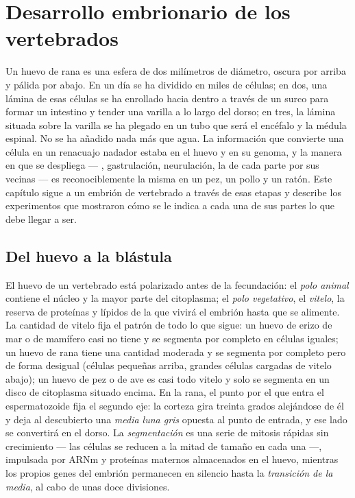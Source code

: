 \chapter{Desarrollo embrionario de los vertebrados}\label{ch:b2:vertebrate-development}

Un huevo de rana es una esfera de dos milímetros de diámetro, oscura por
arriba y pálida por abajo. En un día se ha dividido en miles de células;
en dos, una lámina de esas células se ha enrollado hacia dentro a través
de un surco para formar un intestino y tender una varilla a lo largo del
dorso; en tres, la lámina situada sobre la varilla se ha plegado en un
tubo que será el encéfalo y la médula espinal. No se ha añadido nada más
que agua. La información que convierte una célula en un renacuajo
nadador estaba en el huevo y en su genoma, y la manera en que se despliega
--- , gastrulación, neurulación, la  de cada parte
por sus vecinas --- es reconociblemente la misma en un pez, un pollo y un
ratón. Este capítulo sigue a un embrión de vertebrado a través de esas
etapas y describe los experimentos que mostraron cómo se le indica a cada
una de sus partes lo que debe llegar a ser.

\section{Del huevo a la blástula}

\begin{definition}\label{def:b2:vertebrate-development:egg}
El huevo de un vertebrado está polarizado antes de la fecundación: el
\emph{polo animal} contiene el núcleo y la mayor parte del citoplasma; el
\emph{polo vegetativo}, el \emph{vitelo}, la reserva de proteínas y
lípidos de la que vivirá el embrión hasta que se alimente. La cantidad de
vitelo fija el patrón de todo lo que sigue: un huevo de erizo de mar o de
mamífero casi no tiene y se segmenta por completo en células iguales; un
huevo de rana tiene una cantidad moderada y se segmenta por completo pero
de forma desigual (células pequeñas arriba, grandes células cargadas de
vitelo abajo); un huevo de pez o de ave es casi todo vitelo y solo se
segmenta en un disco de citoplasma situado encima. En la rana, el punto
por el que entra el espermatozoide fija el segundo eje: la corteza gira
treinta grados alejándose de él y deja al descubierto una \emph{media
luna gris} opuesta al punto de entrada, y ese lado se convertirá en el
dorso. La \emph{segmentación} es una serie de mitosis rápidas sin
crecimiento --- las células se reducen a la mitad de tamaño en cada una
---, impulsada por ARNm y proteínas maternos almacenados en el huevo,
mientras los propios genes del embrión permanecen en silencio hasta la
\emph{transición de la  media}, al cabo de unas doce divisiones.
\end{definition}

